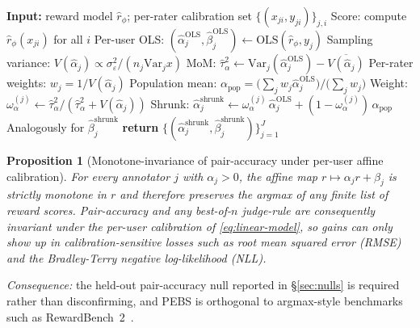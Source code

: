 \documentclass{article}
\newcommand{\PEBS}{\textsc{PEBS}}
\newtheorem{proposition}{Proposition}
\begin{document}
\begin{algorithm}[t]
\caption{\PEBS{}: per-rater empirical-Bayes shrinkage}
\label{alg:pebs}
\begin{algorithmic}[1]
\STATE \textbf{Input:} reward model $\hat r_\phi$;
  per-rater calibration set $\{(x_{ji},y_{ji})\}_{j,i}$
  \STATE Score: compute $\hat r_\phi(x_{ji})$ for all $i$
  \STATE Per-user OLS:
    $(\hat\alpha_j^{\mathrm{OLS}},\hat\beta_j^{\mathrm{OLS}})
       \!\leftarrow\! \mathrm{OLS}(\hat r_\phi, y_j)$
  \STATE Sampling variance:
    $V(\hat\alpha_j)\!\propto\!\sigma_\varepsilon^2/(n_j\mathrm{Var}_j x)$
\ENDFOR
\STATE MoM:
  $\hat\tau_\alpha^2\!\leftarrow\!\mathrm{Var}_j(\hat\alpha_j^{\mathrm{OLS}})
   - \overline{V(\hat\alpha_j)}$
\STATE Per-rater weights: $w_j = 1/V(\hat\alpha_j)$
\STATE Population mean: $\alpha_{\mathrm{pop}} = \big(\sum_j w_j \hat\alpha_j^{\mathrm{OLS}}\big) \big/ \big(\sum_j w_j\big)$
  \STATE Weight:
    $\omega_\alpha^{(j)}\!\leftarrow\!\hat\tau_\alpha^2/
       (\hat\tau_\alpha^2 + V(\hat\alpha_j))$
  \STATE Shrunk:
    $\hat\alpha_j^{\mathrm{shrunk}} \leftarrow
    \omega_\alpha^{(j)}\,\hat\alpha_j^{\mathrm{OLS}}
    + (1{-}\omega_\alpha^{(j)})\,\alpha_{\mathrm{pop}}$
  \STATE Analogously for $\hat\beta_j^{\mathrm{shrunk}}$
\ENDFOR
\STATE \textbf{return} $\{(\hat\alpha_j^{\mathrm{shrunk}},\hat\beta_j^{\mathrm{shrunk}})\}_{j=1}^{J}$
\end{algorithmic}
\end{algorithm}

\begin{proposition}[Monotone-invariance of pair-accuracy under
per-user affine calibration]\label{prop:mi}
For every annotator $j$ with $\alpha_j>0$, the affine map
$r\!\mapsto\!\alpha_j r + \beta_j$ is strictly monotone in $r$ and
therefore preserves the argmax of any finite list of reward scores.
Pair-accuracy and any best-of-$n$ judge-rule are consequently
\emph{invariant} under the per-user calibration of
\eqref{eq:linear-model}, so gains can only show up in
calibration-sensitive losses such as root mean squared
error (RMSE) and the Bradley-Terry negative log-likelihood (NLL).
\end{proposition}
\noindent\emph{Consequence:} the held-out pair-accuracy null
reported in \S\ref{sec:nulls} is required rather than
disconfirming, and PEBS is orthogonal to argmax-style
benchmarks such as
RewardBench~2~\citep{lambert2024rewardbench}.

\end{document}
